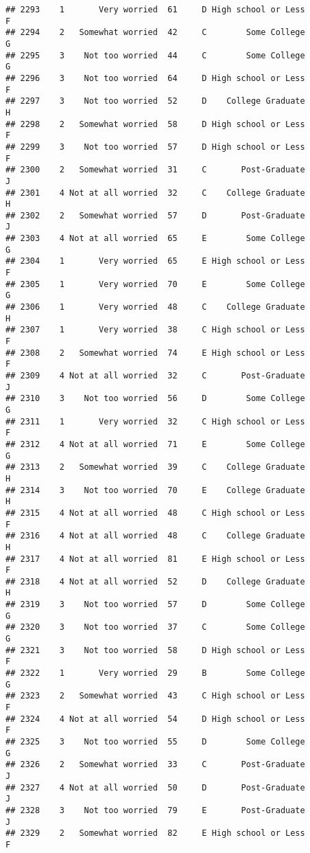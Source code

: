 \documentclass[
]{article}
\begin{document}
\begin{verbatim}
## 2293    1       Very worried  61     D High school or Less         F
## 2294    2   Somewhat worried  42     C        Some College         G
## 2295    3    Not too worried  44     C        Some College         G
## 2296    3    Not too worried  64     D High school or Less         F
## 2297    3    Not too worried  52     D    College Graduate         H
## 2298    2   Somewhat worried  58     D High school or Less         F
## 2299    3    Not too worried  57     D High school or Less         F
## 2300    2   Somewhat worried  31     C       Post-Graduate         J
## 2301    4 Not at all worried  32     C    College Graduate         H
## 2302    2   Somewhat worried  57     D       Post-Graduate         J
## 2303    4 Not at all worried  65     E        Some College         G
## 2304    1       Very worried  65     E High school or Less         F
## 2305    1       Very worried  70     E        Some College         G
## 2306    1       Very worried  48     C    College Graduate         H
## 2307    1       Very worried  38     C High school or Less         F
## 2308    2   Somewhat worried  74     E High school or Less         F
## 2309    4 Not at all worried  32     C       Post-Graduate         J
## 2310    3    Not too worried  56     D        Some College         G
## 2311    1       Very worried  32     C High school or Less         F
## 2312    4 Not at all worried  71     E        Some College         G
## 2313    2   Somewhat worried  39     C    College Graduate         H
## 2314    3    Not too worried  70     E    College Graduate         H
## 2315    4 Not at all worried  48     C High school or Less         F
## 2316    4 Not at all worried  48     C    College Graduate         H
## 2317    4 Not at all worried  81     E High school or Less         F
## 2318    4 Not at all worried  52     D    College Graduate         H
## 2319    3    Not too worried  57     D        Some College         G
## 2320    3    Not too worried  37     C        Some College         G
## 2321    3    Not too worried  58     D High school or Less         F
## 2322    1       Very worried  29     B        Some College         G
## 2323    2   Somewhat worried  43     C High school or Less         F
## 2324    4 Not at all worried  54     D High school or Less         F
## 2325    3    Not too worried  55     D        Some College         G
## 2326    2   Somewhat worried  33     C       Post-Graduate         J
## 2327    4 Not at all worried  50     D       Post-Graduate         J
## 2328    3    Not too worried  79     E       Post-Graduate         J
## 2329    2   Somewhat worried  82     E High school or Less         F

\end{verbatim}
\end{document}
